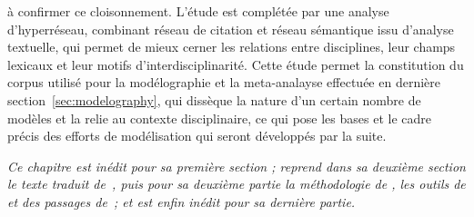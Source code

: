 à confirmer ce cloisonnement. L'étude est complétée par une analyse d'hyperréseau, combinant réseau de citation et réseau sémantique issu d'analyse textuelle, qui permet de mieux cerner les relations entre disciplines, leur champs lexicaux et leur motifs d'interdisciplinarité. Cette étude permet la constitution du corpus utilisé pour la modélographie et la meta-analayse effectuée en dernière section~\ref{sec:modelography}, qui dissèque la nature d'un certain nombre de modèles et la relie au contexte disciplinaire, ce qui pose les bases et le cadre précis des efforts de modélisation qui seront développés par la suite.






\stars


\textit{Ce chapitre est inédit pour sa première section ; reprend dans sa deuxième section le texte traduit de~\cite{raimbault2015models}, puis pour sa deuxième partie la méthodologie de \cite{raimbault2016indirect}, les outils de \cite{bergeaud2017classifying} et des passages de~\cite{}; et est enfin inédit pour sa dernière partie.}







